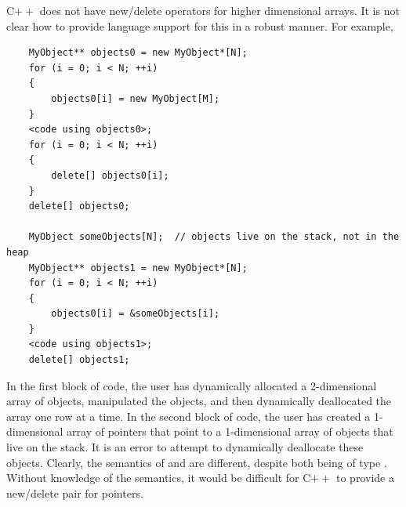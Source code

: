 \documentclass{article}
\begin{document}
C$++$ does not have new/delete operators for higher dimensional arrays.  It is
not clear how to provide language support for this in a robust manner.  For
example,
\begin{verbatim}
    MyObject** objects0 = new MyObject*[N];
    for (i = 0; i < N; ++i)
    {
        objects0[i] = new MyObject[M];
    }
    <code using objects0>;
    for (i = 0; i < N; ++i)
    {
        delete[] objects0[i];
    }
    delete[] objects0;
    
    MyObject someObjects[N];  // objects live on the stack, not in the heap
    MyObject** objects1 = new MyObject*[N];
    for (i = 0; i < N; ++i)
    {
        objects0[i] = &someObjects[i];
    }
    <code using objects1>;
    delete[] objects1;
\end{verbatim}
In the first block of code, the user has dynamically allocated a 2-dimensional
array of  objects, manipulated the objects, and then dynamically
deallocated the array one row at a time.  In the second block of code, the
user has created a 1-dimensional array of  pointers that
point to a 1-dimensional array of  objects that live on the
stack.  It is an error to attempt to dynamically deallocate these objects.
Clearly, the semantics of  and  are different,
despite both being of type .  Without knowledge of the
semantics, it would be difficult for C$++$ to provide a new/delete pair
for  pointers.
\end{document}
